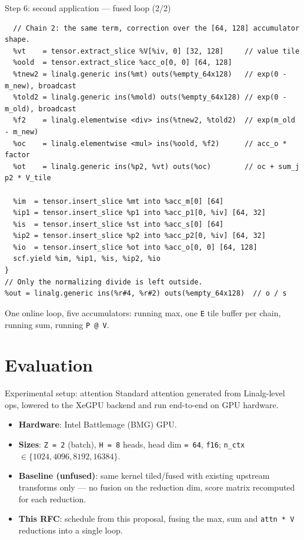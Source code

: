 \documentclass[10pt, aspectratio=169]{beamer}
\newcommand{\code}[1]{\texttt{\small #1}}
\begin{document}
\begin{frame}[fragile]{Step 6: second application --- fused loop (2/2)}
\begin{lstlisting}
  // Chain 2: the same term, correction over the [64, 128] accumulator shape.
  %vt    = tensor.extract_slice %V[%iv, 0] [32, 128]     // value tile
  %oold  = tensor.extract_slice %acc_o[0, 0] [64, 128]
  %tnew2 = linalg.generic ins(%mt) outs(%empty_64x128)   // exp(0 - m_new), broadcast
  %told2 = linalg.generic ins(%mold) outs(%empty_64x128) // exp(0 - m_old), broadcast
  %f2    = linalg.elementwise <div> ins(%tnew2, %told2)  // exp(m_old - m_new)
  %oc    = linalg.elementwise <mul> ins(%oold, %f2)      // acc_o * factor
  %ot    = linalg.generic ins(%p2, %vt) outs(%oc)        // oc + sum_j p2 * V_tile

  %im  = tensor.insert_slice %mt into %acc_m[0] [64]
  %ip1 = tensor.insert_slice %p1 into %acc_p1[0, %iv] [64, 32]
  %is  = tensor.insert_slice %st into %acc_s[0] [64]
  %ip2 = tensor.insert_slice %p2 into %acc_p2[0, %iv] [64, 32]
  %io  = tensor.insert_slice %ot into %acc_o[0, 0] [64, 128]
  scf.yield %im, %ip1, %is, %ip2, %io
}
// Only the normalizing divide is left outside.
%out = linalg.generic ins(%r#4, %r#2) outs(%empty_64x128)  // o / s
\end{lstlisting}
  \small One online loop, five accumulators: running max, one \code{E} tile buffer
  per chain, running sum, running \code{P @ V}.
\end{frame}

\section{Evaluation}

\begin{frame}{Experimental setup: attention}
  Standard attention generated from Linalg-level ops, lowered to the \alert{XeGPU}
  backend and run end-to-end on GPU hardware.
  \begin{itemize}
    \item \textbf{Hardware}: Intel Battlemage (BMG) GPU.
    \item \textbf{Sizes}: \code{Z = 2} (batch), \code{H = 8} heads, head dim
      \code{= 64}, \code{f16}; \code{n\_ctx} $\in \{1024, 4096, 8192, 16384\}$.
    \item \textbf{Baseline (unfused)}: same kernel tiled/fused with existing
      upstream transforms only --- no fusion on the reduction dim, score matrix
      recomputed for each reduction.
    \item \textbf{This RFC}: schedule from this proposal, fusing the max, sum and
      \code{attn * V} reductions into a single loop.
  \end{itemize}
\end{frame}
\end{document}
